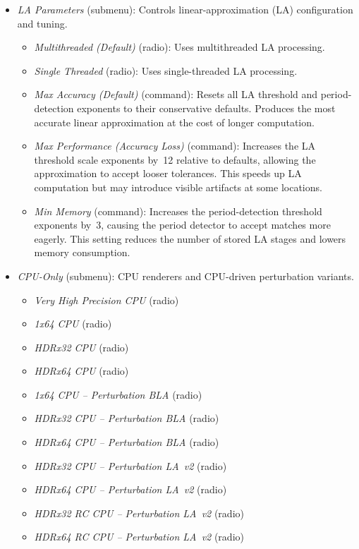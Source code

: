 \begin{itemize}
\begin{itemize}
      \item \emph{LA Parameters} (submenu): Controls linear-approximation (LA) configuration and tuning.
        \begin{itemize}
          \item \emph{Multithreaded (Default)} (radio): Uses multithreaded LA processing.
          \item \emph{Single Threaded} (radio): Uses single-threaded LA processing.
          \item \emph{Max Accuracy (Default)} (command): Resets all LA threshold
          and period-detection exponents to their conservative defaults.  Produces the
          most accurate linear approximation at the cost of longer computation.
          \item \emph{Max Performance (Accuracy Loss)} (command): Increases the LA
          threshold scale exponents by~12 relative to defaults, allowing the
          approximation to accept looser tolerances.  This speeds up LA computation
          but may introduce visible artifacts at some locations.
          \item \emph{Min Memory} (command): Increases the period-detection threshold
          exponents by~3, causing the period detector to accept matches more eagerly.
          This setting reduces the number of stored LA stages and lowers memory consumption.
        \end{itemize}

      \item \emph{CPU-Only} (submenu): CPU renderers and CPU-driven perturbation variants.
        \begin{itemize}
          \item \emph{Very High Precision CPU} (radio)
          \item \emph{1x64 CPU} (radio)
          \item \emph{HDRx32 CPU} (radio)
          \item \emph{HDRx64 CPU} (radio)

          \item \emph{1x64 CPU -- Perturbation BLA} (radio)
          \item \emph{HDRx32 CPU -- Perturbation BLA} (radio)
          \item \emph{HDRx64 CPU -- Perturbation BLA} (radio)

          \item \emph{HDRx32 CPU -- Perturbation LA~v2} (radio)
          \item \emph{HDRx64 CPU -- Perturbation LA~v2} (radio)
          \item \emph{HDRx32 RC CPU -- Perturbation LA~v2} (radio)
          \item \emph{HDRx64 RC CPU -- Perturbation LA~v2} (radio)
        \end{itemize}


\end{itemize}
\end{itemize}
